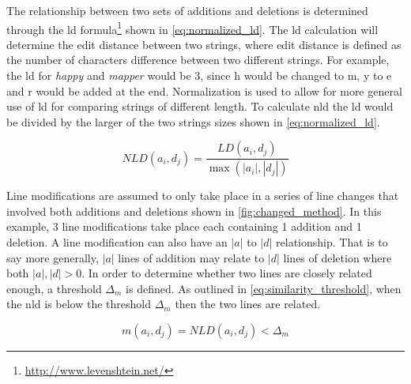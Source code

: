 

% 


The relationship between two sets of additions and deletions is determined through the \gls{ld} formula\footnote{\url{http://www.levenshtein.net/}} shown in \autoref{eq:normalized_ld}. The \gls{ld} calculation will determine the edit distance between two strings, where edit distance is defined as the number of characters difference between two different strings. For example, the \gls{ld} for \textit{happy} and \textit{mapper} would be 3, since h would be changed to m, y to e and r would be added at the end. Normalization is used to allow for more general use of \gls{ld} for comparing strings of different length. To calculate \gls{nld} the \gls{ld} would be divided by the larger of the two strings sizes shown in \autoref{eq:normalized_ld}.


\begin{equation}
\label{eq:normalized_ld}
NLD(a_i, d_j) = \frac{LD(a_i, d_j)}{\max(|a_i|,|d_j|)}
\end{equation}

Line modifications are assumed to only take place in a series of line changes that involved both additions and deletions shown in \autoref{fig:changed_method}. In this example, 3 line modifications take place each containing 1 addition and 1 deletion. A line modification can also have an $|a|$ to $|d|$ relationship. That is to say more generally, $|a|$ lines of addition may relate to $|d|$ lines of deletion where both $|a|, |d| > 0$. In order to determine whether two lines are closely related enough, a threshold $\Delta_m$ is defined. As outlined in \autoref{eq:similarity_threshold}, when the \gls{nld} is below the threshold $\Delta_m$ then the two lines are related.

\begin{equation}
\label{eq:similarity_threshold}
m(a_i, d_j) = NLD(a_i, d_j) < \Delta_m
\end{equation}

